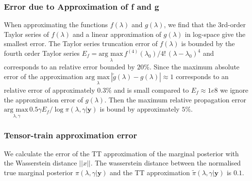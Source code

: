 \subsubsection{Error due to Approximation of f and g}
\label{sec:fgErros}
When approximating the functions $f(\lambda)$ and $g(\lambda)$, we find that the 3rd-order Taylor series of $f(\lambda)$ and a linear approximation of $g(\lambda)$ in log-space give the smallest error.
The Taylor series truncation error of $f(\lambda)$ is bounded by the fourth order Taylor series $E_f = \underset{\lambda}{\text{arg max}\,} f^{(4)}(\lambda_0)/ 4! \, (\lambda - \lambda_{0} )^4$ and corresponds to an relative error bounded by $20\%$.
Since the maximum absolute error of the approximation $\underset{\lambda}{\text{arg max}\,}|\tilde{g}(\lambda) - g(\lambda) | \approx 1$ corresponds to an relative error of approximately $0.3\%$ and is small compared to $E_f \approx 1e8$ we ignore the approximation error of $g(\lambda)$.
Then the maximum relative propagation error $\underset{\lambda, \gamma}{\text{arg max}\,} 0.5 \gamma  E_f / \log{\pi{(\lambda ,\gamma | \bm{y})}} $ is bound by approximately $5\%$.
\subsubsection{Tensor-train approximation error}
We calculate the error of the TT approximation of the marginal posterior with the Wasserstein distance $||x||$.
The wasserstein distance between the normalised true marginal posterior $\pi(\lambda,\gamma|\bm{y})$ and the TT approximation $\tilde{\pi}(\lambda,\gamma|\bm{y})$ is $0.1$.

